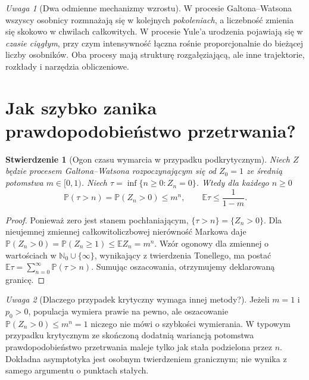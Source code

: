 \documentclass[11pt,a4paper,oneside]{report}
\numberwithin{equation}{chapter}
\theoremstyle{plain}
\newtheorem{stwierdzenie}[twierdzenie]{Stwierdzenie}
\theoremstyle{definition}
\theoremstyle{remark}
\newtheorem{uwaga}{Uwaga}[chapter]
\newcommand{\N}{\mathbb{N}}
\newcommand{\Prob}{\mathbb{P}}
\newcommand{\E}{\mathbb{E}}
\begin{document}
\begin{uwaga}[Dwa odmienne mechanizmy wzrostu]
W procesie Galtona--Watsona wszyscy osobnicy rozmnażają się
w kolejnych \emph{pokoleniach}, a liczebność zmienia się
skokowo w chwilach całkowitych. W procesie Yule'a
urodzenia pojawiają się w \emph{czasie ciągłym}, przy czym
intensywność łączna rośnie proporcjonalnie do bieżącej liczby
osobników. Oba procesy mają strukturę rozgałęziającą,
ale inne trajektorie, rozkłady i narzędzia obliczeniowe.
\end{uwaga}


\section{Jak szybko zanika prawdopodobieństwo przetrwania?}
\begin{stwierdzenie}[Ogon czasu wymarcia w przypadku podkrytycznym]
Niech $Z$ będzie procesem Galtona--Watsona rozpoczynającym się
od $Z_0=1$ ze średnią potomstwa $m\in[0,1)$.
Niech $\tau=\inf\{n\ge0:Z_n=0\}$.
Wtedy dla każdego $n\ge0$
\[
\Prob(\tau>n)=\Prob(Z_n>0)\le m^n,
\qquad \E\tau\le\frac{1}{1-m}.
\]
\end{stwierdzenie}
\begin{proof}
Ponieważ zero jest stanem pochłaniającym,
$\{\tau>n\}=\{Z_n>0\}$. Dla nieujemnej zmiennej
całkowitoliczbowej nierówność Markowa daje
$\Prob(Z_n>0)=\Prob(Z_n\ge1)\le\E Z_n=m^n$.
Wzór ogonowy dla zmiennej o wartościach w $\N_0\cup\{\infty\}$,
wynikający z twierdzenia Tonellego, ma postać
$\E\tau=\sum_{n=0}^\infty\Prob(\tau>n)$.
Sumując oszacowania, otrzymujemy deklarowaną granicę.
\end{proof}

\begin{uwaga}[Dlaczego przypadek krytyczny wymaga innej metody?]
Jeżeli $m=1$ i $p_0>0$, populacja wymiera prawie na pewno,
ale oszacowanie $\Prob(Z_n>0)\le m^n=1$ niczego nie mówi
o szybkości wymierania. W typowym przypadku krytycznym
ze skończoną dodatnią wariancją potomstwa prawdopodobieństwo
przetrwania maleje tylko jak stała podzielona przez $n$.
Dokładna asymptotyka jest osobnym twierdzeniem granicznym;
nie wynika z samego argumentu o punktach stałych.
\end{uwaga}
\end{document}
